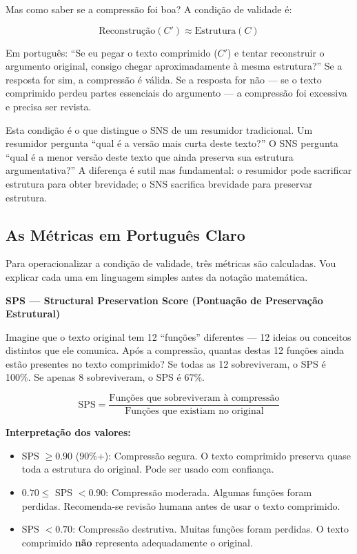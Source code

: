 Mas como saber se a compressão foi boa? A condição de validade é:

\begin{equation}
\text{Reconstrução}(C') \approx \text{Estrutura}(C)
\label{eq:reconstrucao}
\end{equation}

Em português: ``Se eu pegar o texto comprimido ($C'$) e tentar reconstruir o argumento original, consigo chegar aproximadamente à mesma estrutura?'' Se a resposta for sim, a compressão é válida. Se a resposta for não — se o texto comprimido perdeu partes essenciais do argumento — a compressão foi excessiva e precisa ser revista.

Esta condição é o que distingue o SNS de um resumidor tradicional. Um resumidor pergunta ``qual é a versão mais curta deste texto?'' O SNS pergunta ``qual é a menor versão deste texto que ainda preserva sua estrutura argumentativa?'' A diferença é sutil mas fundamental: o resumidor pode sacrificar estrutura para obter brevidade; o SNS sacrifica brevidade para preservar estrutura.

\subsection{As Métricas em Português Claro}

Para operacionalizar a condição de validade, três métricas são calculadas. Vou explicar cada uma em linguagem simples antes da notação matemática.

\textbf{SPS — Structural Preservation Score (Pontuação de Preservação Estrutural)}

Imagine que o texto original tem 12 ``funções'' diferentes — 12 ideias ou conceitos distintos que ele comunica. Após a compressão, quantas destas 12 funções ainda estão presentes no texto comprimido? Se todas as 12 sobreviveram, o SPS é 100\%. Se apenas 8 sobreviveram, o SPS é 67\%.

\begin{equation}
\text{SPS} = \frac{\text{Funções que sobreviveram à compressão}}{\text{Funções que existiam no original}}
\label{eq:sps}
\end{equation}

\textbf{Interpretação dos valores:}
\begin{itemize}
    \item SPS $\geq 0.90$ (90\%+): Compressão segura. O texto comprimido preserva quase toda a estrutura do original. Pode ser usado com confiança.
    \item $0.70 \leq$ SPS $< 0.90$: Compressão moderada. Algumas funções foram perdidas. Recomenda-se revisão humana antes de usar o texto comprimido.
    \item SPS $< 0.70$: Compressão destrutiva. Muitas funções foram perdidas. O texto comprimido \textbf{não} representa adequadamente o original.
\end{itemize}

